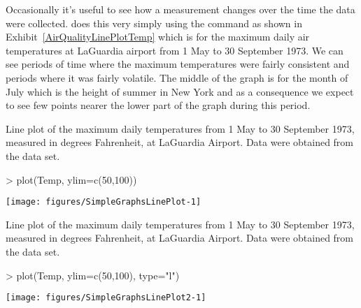 Occasionally it's useful to see how a measurement changes over the time the data were collected. \R{} does this very simply using the  command as shown in Exhibit~\ref{AirQualityLinePlotTemp} which is for the maximum daily air temperatures at LaGuardia airport from 1 May to 30 September 1973. We can see periods of time where the maximum temperatures were fairly consistent and periods where it was fairly volatile. The middle of the graph is for the month of July which is the height of summer in New York and as a consequence we expect to see few points nearer the lower part of the graph during this period. 
\begin{exhibit} 
\begin{center} 
\caption{Line plot of the maximum daily temperatures from 1 May to 30 September 1973, measured in degrees Fahrenheit, at LaGuardia Airport. Data were obtained from the  data set.} 
\label{AirQualityLinePlotTemp} 

\begin{Schunk}
\begin{Sinput}
> plot(Temp, ylim=c(50,100)) 
\end{Sinput}

\texttt{[image: figures/SimpleGraphsLinePlot-1]} \end{Schunk}

\end{center} 
\end{exhibit} 
\begin{exhibit} 
\begin{center} 
\caption{Line plot of the maximum daily temperatures from 1 May to 30 September 1973, measured in degrees Fahrenheit, at LaGuardia Airport. Data were obtained from the  data set.} 
\label{AirQualityLinePlotTemp2} 

\begin{Schunk}
\begin{Sinput}
> plot(Temp, ylim=c(50,100), type="l") 
\end{Sinput}

\texttt{[image: figures/SimpleGraphsLinePlot2-1]} \end{Schunk}

\end{center} 
\end{exhibit} 
 
 
